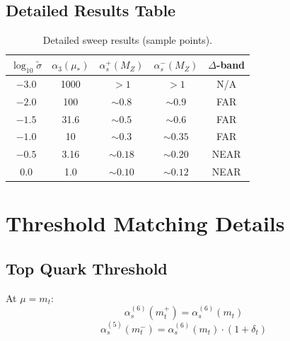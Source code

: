 \documentclass[11pt,a4paper]{article}
\theoremstyle{definition}
\begin{document}
\subsection{Detailed Results Table}
\label{subsec:detailed-results}

\begin{quarantinebox}
\begin{table}[ht]
\centering
\caption{Detailed sweep results (sample points).}
\label{tab:detailed-sweep}
\begin{tabular}{ccccc}
\toprule
$\log_{10}\tilde{\sigma}$ & $\alpha_3(\mu_*)$ & $\alpha_s^+(M_Z)$ & $\alpha_s^-(M_Z)$ & $\Delta$-band \\
\midrule
$-3.0$ & 1000 & $>1$ & $>1$ & N/A \\
$-2.0$ & 100 & $\sim 0.8$ & $\sim 0.9$ & FAR \\
$-1.5$ & 31.6 & $\sim 0.5$ & $\sim 0.6$ & FAR \\
$-1.0$ & 10 & $\sim 0.3$ & $\sim 0.35$ & FAR \\
$-0.5$ & 3.16 & $\sim 0.18$ & $\sim 0.20$ & NEAR \\
$0.0$ & 1.0 & $\sim 0.10$ & $\sim 0.12$ & NEAR \\
\bottomrule
\end{tabular}
\end{table}
\end{quarantinebox}

\section{Threshold Matching Details}
\label{app:threshold-details}

\subsection{Top Quark Threshold}
\label{subsec:top-threshold}

At $\mu = m_t$:
\begin{equation}
\label{eq:top-match-above}
\alpha_s^{(6)}(m_t^+) = \alpha_s^{(6)}(m_t)
\end{equation}
\begin{equation}
\label{eq:top-match-below}
\alpha_s^{(5)}(m_t^-) = \alpha_s^{(6)}(m_t) \cdot \left(1 + \delta_t\right)
\end{equation}
\end{document}

